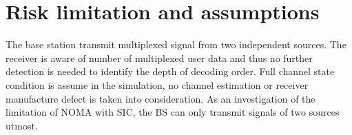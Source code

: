 \section{Risk limitation and assumptions}
\label{sec_risk_limit}
The base station transmit multiplexed signal from two independent sources.
The receiver is aware of number of multiplexed user data and thus no further
detection is needed to identify the depth of decoding order.
Full channel state condition is assume in the simulation, no channel estimation
or receiver manufacture defect is taken into consideration.
As an investigation of the limitation of NOMA with SIC, the BS can only transmit
signals of two sources utmost.
